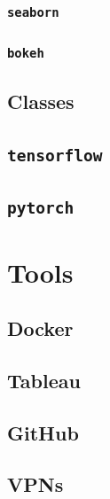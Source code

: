 \documentclass[
]{book}
\begin{document}
\hypertarget{p-seaborn}{%
\subsection{\texorpdfstring{\texttt{seaborn}}{seaborn}}\label{p-seaborn}}

\hypertarget{p-bokeh}{%
\subsection{\texorpdfstring{\texttt{bokeh}}{bokeh}}\label{p-bokeh}}

\hypertarget{p-classes}{%
\section{Classes}\label{p-classes}}

\hypertarget{tensorflow}{%
\section{\texorpdfstring{\texttt{tensorflow}}{tensorflow}}\label{tensorflow}}

\hypertarget{pytorch}{%
\section{\texorpdfstring{\texttt{pytorch}}{pytorch}}\label{pytorch}}

\hypertarget{tools}{%
\chapter{Tools}\label{tools}}

\hypertarget{docker}{%
\section{Docker}\label{docker}}

\hypertarget{tableau}{%
\section{Tableau}\label{tableau}}

\hypertarget{github}{%
\section{GitHub}\label{github}}

\hypertarget{vpns}{%
\section{VPNs}\label{vpns}}
\end{document}
